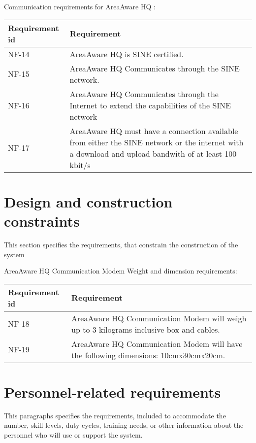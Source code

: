 Communication requirements for AreaAware HQ :
\begin{longtable}{| p{3.2cm} |  p{10cm} | }
	\hline
	\textbf{Requirement id} &  \textbf{Requirement } \\
	\hline
	NF-14 & AreaAware HQ is SINE certified.  \\
	\hline
	NF-15 & AreaAware HQ Communicates through the SINE network. \\
	\hline
	NF-16 & AreaAware HQ Communicates through the Internet to extend the capabilities of the SINE network \\
	\hline
	NF-17 & AreaAware HQ must have a connection available from either the SINE network or the internet with a download and upload bandwith of at least 100 kbit/s \\
	\hline
\end{longtable}




\label{sec_nonFunc5}
\section{Design and construction constraints}
This section specifies the requirements, that constrain the construction of the system

AreaAware HQ Communication Modem Weight and dimension requirements:
\begin{longtable}{| p{3.2cm} |  p{10cm} | }
	\hline
	\textbf{Requirement id} &  \textbf{Requirement } \\
	\hline
	NF-18 & AreaAware HQ Communication Modem will weigh up to 3 kilograms inclusive box and cables.  \\
	\hline
	NF-19 & AreaAware HQ Communication Modem will have the following dimensions: 10cmx30cmx20cm. \\
	\hline
\end{longtable}

\label{sec_nonFunc6}
\section{Personnel-related requirements}
This paragraphs specifies the requirements, included to accommodate the number, skill levels, duty cycles, training needs, or other information about the personnel who will use or support the system.


